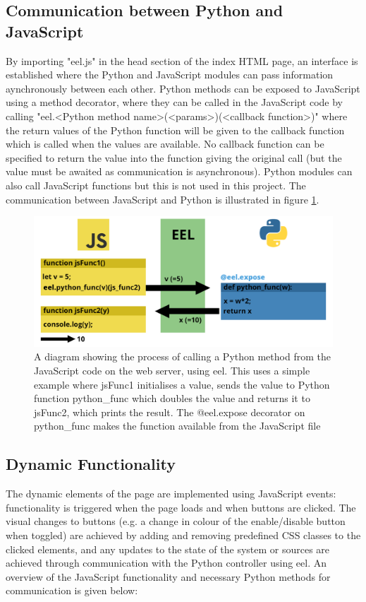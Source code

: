 \documentclass{l4proj}
\begin{document}
\subsection{Communication between Python and JavaScript}
By importing "eel.js" in the head section of the index HTML page, an interface is established where the Python and JavaScript modules can pass information aynchronously between each other. Python methods can be exposed to JavaScript using a method decorator, where they can be called in the JavaScript code by calling "eel.<Python method name>(<params>)(<callback function>)" where the return values of the Python function will be given to the callback function which is called when the values are available. No callback function can be specified to return the value into the function giving the original call (but the value must be awaited as communication is asynchronous). Python modules can also call JavaScript functions but this is not used in this project. The communication between JavaScript and Python is illustrated in figure \ref{fig:eel-communication}.

\begin{figure}[!ht]
\includegraphics[width=\textwidth]{images/eel-communication.png}
\caption{A diagram showing the process of calling a Python method from the JavaScript code on the web server, using eel. This uses a simple example where jsFunc1 initialises a value, sends the value to Python function python\_func which doubles the value and returns it to jsFunc2, which prints the result. The @eel.expose decorator on python\_func makes the function available from the JavaScript file}
\label{fig:eel-communication}
\end{figure}

\subsection{Dynamic Functionality}
The dynamic elements of the page are implemented using JavaScript events: functionality is triggered when the page loads and when buttons are clicked. The visual changes to buttons (e.g. a change in colour of the enable/disable button when toggled) are achieved by adding and removing predefined CSS classes to the clicked elements, and any updates to the state of the system or sources are achieved through communication with the Python controller using eel. An overview of the JavaScript functionality and necessary Python methods for communication is given below:
\end{document}

